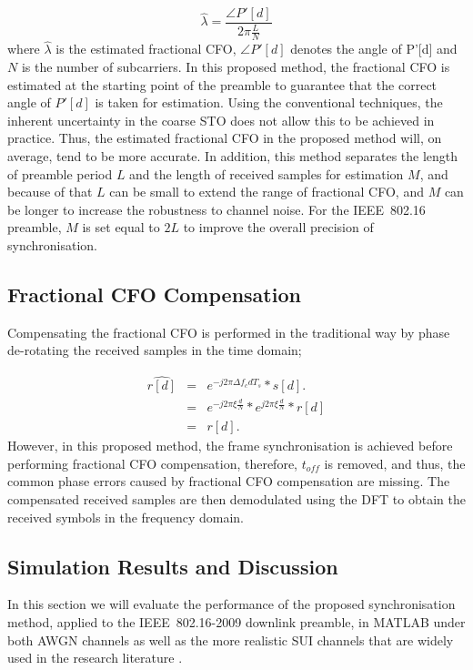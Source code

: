 \begin{equation}
\label{proposedfractionalCFO}
\hat{\lambda} = \frac{\angle P'[d]}{2\pi \frac{L}{N}}
\end{equation}
where $\hat{\lambda}$ is the estimated fractional CFO, $\angle P'[d]$ denotes the angle of P'[d] and $N$ is the number of subcarriers.
In this proposed method, the fractional CFO is estimated at the starting point of the preamble to guarantee that the correct angle of $P'[d]$ is taken for estimation. Using the conventional techniques, the inherent uncertainty in the coarse STO does not allow this to be achieved in practice.
Thus, the estimated fractional CFO in the proposed method will, on average, tend to be more accurate.
In addition, this method separates the length of preamble period $L$ and the length of received samples for estimation $M$, and because of that $L$ can be small to extend the range of fractional CFO, and $M$ can be longer to increase the robustness to channel noise. For the IEEE~802.16 preamble, $M$ is set equal to $2L$ to improve the overall precision of synchronisation.

\subsection{Fractional CFO Compensation} 

Compensating the fractional CFO is performed in the traditional way by phase de-rotating the received samples in the time domain;

\begin{eqnarray}
\label{proposedcomfreoffsignal}
\widehat{r[d]} &=&  e^{-j2\pi\Delta f_{c}dT_{s}}*s[d]. \nonumber \\
&=&  e^{-j2\pi\xi \frac{d}{N}}*e^{j2\pi\xi \frac{d}{N}}*r[d] \nonumber \\
&=& r[d].
\end{eqnarray}
However, in this proposed method, the frame synchronisation is achieved before performing fractional CFO compensation, therefore, $t_{off}$ is removed, and thus, the common phase errors caused by fractional CFO compensation are missing. 
The compensated received samples are then demodulated using the DFT to obtain the received symbols in the frequency domain.

\subsection{Simulation Results and Discussion}
In this section we will evaluate the performance of the proposed synchronisation method, applied to the IEEE~802.16-2009 downlink preamble, in MATLAB under both AWGN channels as well as the more realistic SUI channels that are widely used in the research literature \cite{Kishore2006,Kim2008}.

